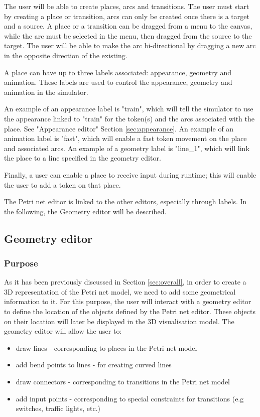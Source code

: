 The user will be able to create places, arcs and transitions. The user must start by creating a place or transition, arcs can only be created once there is a target and a source. A place or a transition can be dragged from a menu to the canvas, while the arc must be selected in the menu, then dragged from the source to the target. The user will be able to make the arc bi-directional by dragging a new arc in the opposite direction of the existing. 

A place can have up to three labels associated: appearance, geometry and animation. These labels are used to control the appearance, geometry and animation in the simulator. 

An example of an appearance label is "train", which will tell the simulator to use the appearance linked to "train" for the token(s) and the arcs associated with the place. See "Appearance editor" Section \ref{sec:appearance}. An example of an animation label is "fast", which will enable a fast token movement on the place and associated arcs. An example of a geometry label is "line\_1", which will link the place to a line specified in the geometry editor. 

Finally, a user can enable a place to receive input during runtime; this will enable the user to add a token on that place.

The Petri net editor is linked to the other editors, especially through labels. In the following, the Geometry editor will be described. 

\subsection{Geometry editor}


\subsubsection{Purpose}
As it has been previously discussed in Section \ref{sec:overall}, in order to create a 3D representation of the Petri net model, we need to add some geometrical information to it.  For this purpose, the user will interact with a geometry editor to define the location of the objects defined by the Petri net editor. These objects on their location will later be displayed in the 3D visualisation model. 
The geometry editor will allow the user to:
\begin{itemize}
\item draw lines - corresponding to places in the Petri net model
\item add bend points to lines - for creating curved lines
\item draw connectors - corresponding to transitions in the Petri net model
\item add input points  - corresponding to special constraints for transitions (e.g switches, traffic lights, etc.)
\end{itemize}

